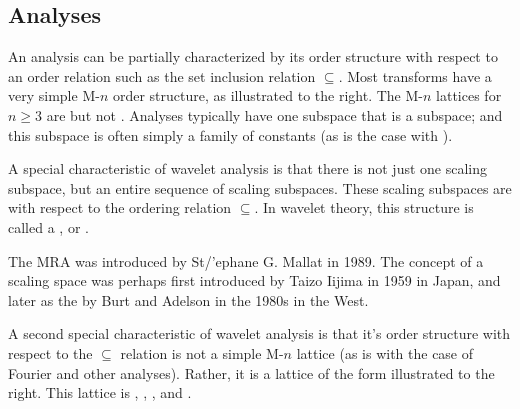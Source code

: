 \subsection{Analyses}
    \begin{minipage}{\tw-65mm}%
      An analysis can be partially characterized by its order structure with respect
      to an order relation such as the set inclusion relation $\subseteq$.
      Most transforms have a very simple M-$n$ order structure,
      as illustrated to the right.
      The M-$n$ lattices for $n\ge3$ are  but not .
      Analyses typically have one subspace that is a  subspace;
      and this subspace is often simply a family of constants
      (as is the case with ).
    \end{minipage}%
    \hfill{}%

    \begin{minipage}{\tw-55mm}%
      A special characteristic of wavelet analysis is that there is not just one
      scaling subspace,
      but an entire sequence of scaling subspaces.
      These scaling subspaces are  with respect to the
      ordering relation $\subseteq$. In wavelet theory, this structure is called a ,
      or  .

     The MRA was introduced by St{/'e}phane G. Mallat in 1989.
     The concept of a scaling space was perhaps first introduced by Taizo Iijima in 1959 in Japan,
    and later as the  by Burt and Adelson in the 1980s in the West.\footnotemark
    \end{minipage}%
    \hfill{}%

    \begin{minipage}{\tw-65mm}%
      A second special characteristic of wavelet analysis is that it's order structure
      with respect to the $\subseteq$ relation is not a simple M-$n$ lattice 
     (as is with the case of Fourier and other analyses).
      Rather, it is a lattice of the form illustrated to the right.
      This lattice is , ,
      , and  .
    \end{minipage}%
    \hfill{}%

